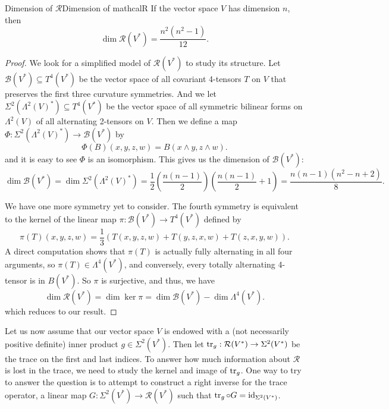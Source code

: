 \documentclass[../main.tex]{subfiles}
\begin{document}
\begin{proposition}{Dimension of $\mathcal{R}$}{Dimension of mathcalR}
	If the vector space $V$ has dimension $n$, then
	\begin{equation}
		\dim \mathcal{R}(V^*) = \frac{n^2(n^2 - 1)}{12}.
	\end{equation}
\end{proposition}
\begin{proof}
	We look for a simplified model of $\mathcal{R}(V^*)$ to study its structure. Let $\mathcal{B}(V^*) \subseteq T^4(V^*)$ be the vector space of all covariant 4-tensors $T$ on $V$ that preserves the first three curvature symmetries. And we let $\Sigma^2(\Lambda^2(V)^*) \subseteq T^4(V^*)$ be the vector space of all symmetric bilinear forms on $\Lambda^2(V)$ of all alternating 2-tensors on $V$. Then we define a map $\Phi: \Sigma^2(\Lambda^2(V)^*) \to \mathcal{B}(V^*)$ by
	\begin{equation}
		\Phi(B)(x, y, z, w) = B(x \wedge y, z \wedge w).
	\end{equation}
	and it is easy to see $\Phi$ is an isomorphism. This gives us the dimension of $\mathcal{B}(V^*)$:
	\begin{equation*}
		\dim \mathcal{B}(V^*) = \dim \Sigma^2(\Lambda^2(V)^*) = \frac{1}{2} \left( \frac{n(n-1)}{2} \right) \left( \frac{n(n-1)}{2} + 1 \right) = \frac{n(n-1)(n^2 - n + 2)}{8}.
	\end{equation*}

	We have one more symmetry yet to consider. The fourth symmetry is equivalent to the kernel of the linear map $\pi: \mathcal{B}(V^*) \to T^4(V^*)$ defined by
	\begin{equation*}
		\pi(T)(x, y, z, w) = \frac{1}{3}(T(x, y, z, w) + T(y, z, x, w) + T(z, x, y, w)).
	\end{equation*}
	A direct computation shows that $\pi(T)$ is actually fully alternating in all four arguments, so $\pi(T) \in \Lambda^4(V^*)$, and conversely, every totally alternating 4-tensor is in $B(V^*)$. So $\pi$ is surjective, and thus, we have
	\begin{equation*}
		\dim \mathcal{R}(V^*) = \dim \ker \pi = \dim \mathcal{B}(V^*) - \dim \Lambda^4(V^*).
	\end{equation*}
	which reduces to our result.
\end{proof}

Let us now assume that our vector space $V$ is endowed with a (not necessarily positive definite) inner product $g \in \Sigma^2(V^*)$. Then let $\operatorname{tr}_g: \mathcal{R}(V^*) \to \Sigma^2(V^*)$ be the trace on the first and last indices. To answer how much information about $\mathcal{R}$ is lost in the trace, we need to study the kernel and image of $\operatorname{tr}_g$. One way to try to answer the question is to attempt to construct a right inverse for the trace operator, a linear map $G: \Sigma^2(V^*) \to \mathcal{R}(V^*)$ such that $\operatorname{tr}_g \circ G = \mathrm{id}_{\Sigma^2(V^*)}$.
\end{document}
